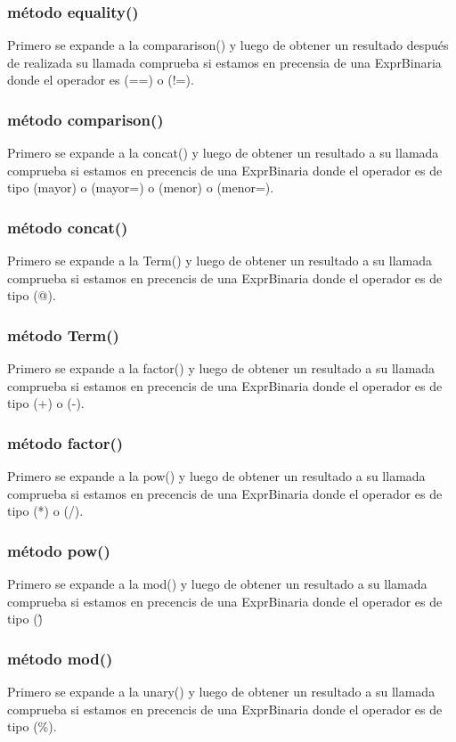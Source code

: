 \documentclass[a4paper,12pt]{article}
\begin{document}
\subsubsection[short]{ método equality()}
Primero se expande a la compararison() y luego de obtener un resultado después de realizada su llamada comprueba si estamos en precensia de una ExprBinaria donde el operador es (==) o (!=).
\subsubsection[short]{ método comparison()}
Primero se expande a la concat() y luego de obtener un resultado a su llamada comprueba si estamos en precencis de una ExprBinaria donde el operador es de tipo (mayor) o (mayor=) o (menor) o (menor=).
\subsubsection[short]{ método concat()}
Primero se expande a la Term() y luego de obtener un resultado a su llamada comprueba si estamos en precencis de una ExprBinaria donde el operador es de tipo (@).
\subsubsection[short]{ método Term()}
Primero se expande a la factor() y luego de obtener un resultado a su llamada comprueba si estamos en precencis de una ExprBinaria donde el operador es de tipo (+) o (-).
\subsubsection[short]{ método factor()}
Primero se expande a la pow() y luego de obtener un resultado a su llamada comprueba si estamos en precencis de una ExprBinaria donde el operador es de tipo (*) o (/).
\subsubsection[short]{ método pow()}
Primero se expande a la mod() y luego de obtener un resultado a su llamada comprueba si estamos en precencis de una ExprBinaria donde el operador es de tipo (\^)
\subsubsection[short]{ método mod()}
Primero se expande a la unary() y luego de obtener un resultado a su llamada comprueba si estamos en precencis de una ExprBinaria donde el operador es de tipo (\%).
\end{document}
